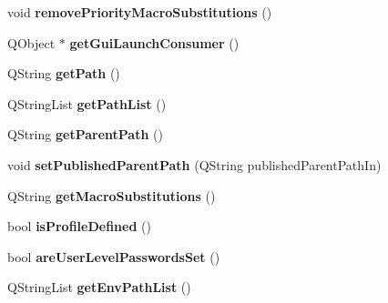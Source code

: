 \begin{DoxyCompactItemize}
\item 
\hypertarget{classContainerProfile_a6352d509a91428daf6bb8b57d440c4c3}{
void {\bfseries removePriorityMacroSubstitutions} ()}
\label{classContainerProfile_a6352d509a91428daf6bb8b57d440c4c3}

\item 
\hypertarget{classContainerProfile_a989941cd1a5c85125e144069f98fbc09}{
QObject $\ast$ {\bfseries getGuiLaunchConsumer} ()}
\label{classContainerProfile_a989941cd1a5c85125e144069f98fbc09}

\item 
\hypertarget{classContainerProfile_ae9a61bc7d3f0a13c03e19a54f7ad32c0}{
QString {\bfseries getPath} ()}
\label{classContainerProfile_ae9a61bc7d3f0a13c03e19a54f7ad32c0}

\item 
\hypertarget{classContainerProfile_aa50e72d82702a109e360381958e6fd69}{
QStringList {\bfseries getPathList} ()}
\label{classContainerProfile_aa50e72d82702a109e360381958e6fd69}

\item 
\hypertarget{classContainerProfile_a6b0109ef1cc0750f4855554f22d5724e}{
QString {\bfseries getParentPath} ()}
\label{classContainerProfile_a6b0109ef1cc0750f4855554f22d5724e}

\item 
\hypertarget{classContainerProfile_a39fb2a71796d844fbd46ad4528cf7a64}{
void {\bfseries setPublishedParentPath} (QString publishedParentPathIn)}
\label{classContainerProfile_a39fb2a71796d844fbd46ad4528cf7a64}

\item 
\hypertarget{classContainerProfile_a3d429a09d4a5fa8b8fb732e8e65486c6}{
QString {\bfseries getMacroSubstitutions} ()}
\label{classContainerProfile_a3d429a09d4a5fa8b8fb732e8e65486c6}

\item 
\hypertarget{classContainerProfile_a78ecf171340a947b39346bf9dac0d1aa}{
bool {\bfseries isProfileDefined} ()}
\label{classContainerProfile_a78ecf171340a947b39346bf9dac0d1aa}

\item 
\hypertarget{classContainerProfile_ae03f8cdb662ab187881e617a6a2e0e04}{
bool {\bfseries areUserLevelPasswordsSet} ()}
\label{classContainerProfile_ae03f8cdb662ab187881e617a6a2e0e04}

\item 
\hypertarget{classContainerProfile_ab90051c321470602cd06879cf66dc2db}{
QStringList {\bfseries getEnvPathList} ()}
\label{classContainerProfile_ab90051c321470602cd06879cf66dc2db}


\end{DoxyCompactItemize}
